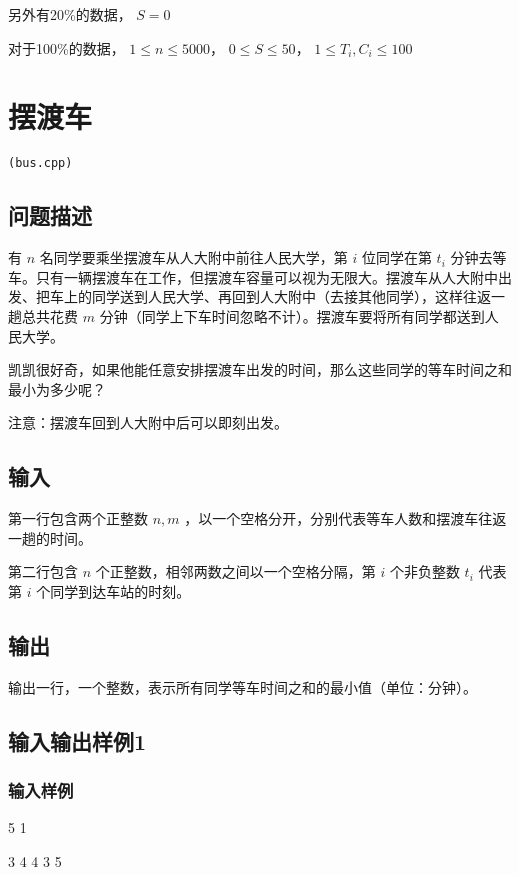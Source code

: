 \documentclass[UTF8]{ctexart}
\begin{document}
另外有20\%的数据， $S=0$

对于100\%的数据， $1\le n\le 5000$， $0\le S\le 50$， $1\le T_i,C_i\le 100$

\newpage
\section{摆渡车}
\begin{center}
\tt\large{(bus.cpp)}
\end{center}
\subsection{问题描述}

有 $n$ 名同学要乘坐摆渡车从人大附中前往人民大学，第 $i$ 位同学在第 $t_i$ 分钟去等车。只有一辆摆渡车在工作，但摆渡车容量可以视为无限大。摆渡车从人大附中出发、把车上的同学送到人民大学、再回到人大附中（去接其他同学），这样往返一趟总共花费 $m$ 分钟（同学上下车时间忽略不计）。摆渡车要将所有同学都送到人民大学。

凯凯很好奇，如果他能任意安排摆渡车出发的时间，那么这些同学的等车时间之和最小为多少呢？

注意：摆渡车回到人大附中后可以即刻出发。

\subsection{输入}

第一行包含两个正整数 $n,m$ ，以一个空格分开，分别代表等车人数和摆渡车往返一趟的时间。

第二行包含 $n$ 个正整数，相邻两数之间以一个空格分隔，第 $i$ 个非负整数   $t_i$ 代表第 $i$ 个同学到达车站的时刻。

\subsection{输出}

输出一行，一个整数，表示所有同学等车时间之和的最小值（单位：分钟）。

\subsection{输入输出样例1}
\subsubsection{输入样例}

5 1 

3 4 4 3 5 
\end{document}
